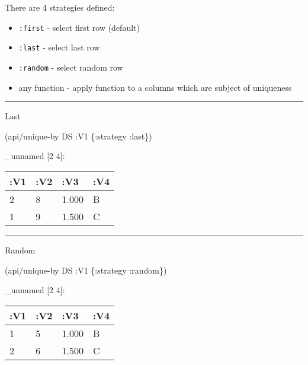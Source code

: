 \documentclass[]{article}
\newenvironment{Shaded}{\begin{snugshade}}{\end{snugshade}}
\newcommand{\AttributeTok}[1]{\textcolor[rgb]{0.77,0.63,0.00}{#1}}
\newcommand{\NormalTok}[1]{#1}
\providecommand{\tightlist}{%
  \setlength{\itemsep}{0pt}\setlength{\parskip}{0pt}}
\begin{document}
There are 4 strategies defined:

\begin{itemize}
\tightlist
\item
  \texttt{:first} - select first row (default)
\item
  \texttt{:last} - select last row
\item
  \texttt{:random} - select random row
\item
  any function - apply function to a columns which are subject of
  uniqueness
\end{itemize}

\begin{center}\rule{0.5\linewidth}{0.5pt}\end{center}

Last

\begin{Shaded}
\begin{Highlighting}[]
\NormalTok{(api/unique-by DS }\AttributeTok{:V1}\NormalTok{ \{}\AttributeTok{:strategy} \AttributeTok{:last}\NormalTok{\})}
\end{Highlighting}
\end{Shaded}

\_unnamed {[}2 4{]}:

\begin{longtable}[]{@{}llll@{}}
\toprule
:V1 & :V2 & :V3 & :V4\tabularnewline
\midrule
\endhead
2 & 8 & 1.000 & B\tabularnewline
1 & 9 & 1.500 & C\tabularnewline
\bottomrule
\end{longtable}

\begin{center}\rule{0.5\linewidth}{0.5pt}\end{center}

Random

\begin{Shaded}
\begin{Highlighting}[]
\NormalTok{(api/unique-by DS }\AttributeTok{:V1}\NormalTok{ \{}\AttributeTok{:strategy} \AttributeTok{:random}\NormalTok{\})}
\end{Highlighting}
\end{Shaded}

\_unnamed {[}2 4{]}:

\begin{longtable}[]{@{}llll@{}}
\toprule
:V1 & :V2 & :V3 & :V4\tabularnewline
\midrule
\endhead
1 & 5 & 1.000 & B\tabularnewline
2 & 6 & 1.500 & C\tabularnewline
\bottomrule
\end{longtable}
\end{document}
